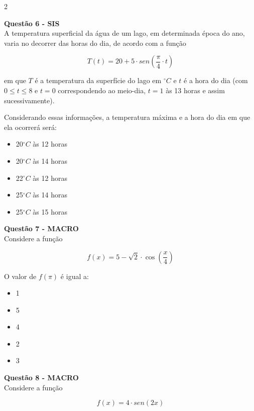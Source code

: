 \documentclass[12pt]{article}
\begin{document}
\begin{multicols}{2}
\vspace{0.3cm}

\textbf{Questão 6 - SIS} \\

A temperatura superficial da água de um lago, em determinada época do ano, varia no decorrer das horas do dia, de acordo com a função

\[
T(t) = 20 + 5 \cdot sen\left( \frac{\pi}{4} \cdot t \right)
\]

em que \(T\) é a temperatura da superfície do lago em \(^\circ C\) e \(t\) é a hora do dia (com \(0 \leq t \leq 8\) e \(t = 0\) correspondendo ao meio-dia, \(t = 1\) às 13 horas e assim sucessivamente).

Considerando essas informações, a temperatura máxima e a hora do dia em que ela ocorrerá será:

\begin{itemize}
    \item[(A)] 20\(^\circ C\) às 12 horas
    \item[(B)] 20\(^\circ C\) às 14 horas
    \item[(C)] 22\(^\circ C\) às 12 horas
    \item[(D)] 25\(^\circ C\) às 14 horas
    \item[(E)] 25\(^\circ C\) às 15 horas
\end{itemize}
\textbf{Questão 7 - MACRO} \\

Considere a função 

\[
f(x) = 5 - \sqrt{2} \cdot \cos\left( \frac{x}{4} \right)
\]

O valor de \(f(\pi)\) é igual a:

\begin{itemize}
    \item[(A)] 1
    \item[(B)] 5
    \item[(C)] 4
    \item[(D)] 2
    \item[(E)] 3
\end{itemize}

\vspace{0.3cm}

\textbf{Questão 8 - MACRO} \\

Considere a função 

\[
f(x) = 4 \cdot sen(2x)
\]


\end{multicols}
\end{document}
